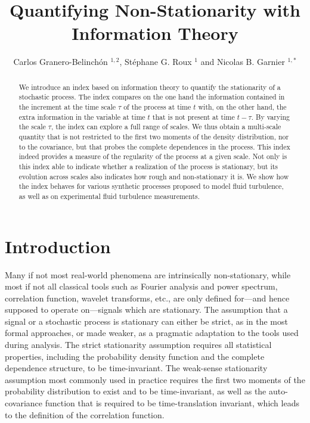 \documentclass[aps,pra,groupedaddress,notitlepage]{revtex4-1}
\begin{document}
\title{Quantifying Non-Stationarity with Information Theory}
\author{Carlos Granero-Belinch\'on $^{1,2}$, St\'ephane G. Roux $^1$  and  Nicolas B. Garnier $^{1,*}$}
\address{%
$^{1}$ Univ Lyon, Ens de Lyon, Univ Claude Bernard, CNRS UMR 5672, Laboratoire de Physique, F-69342 Lyon, France; \\
$^{2}$ IMT Atlantique, Lab-STICC, UMR CNRS 6285, F-29238 Brest, France.}

\begin{abstract}
We introduce an index based on information theory to quantify the stationarity of a stochastic process.
The index compares on the one hand the information contained in the increment at the time scale $\tau$ of the process at time $t$ with, on the other hand, the extra information in the variable at time $t$ that is not present at time $t-\tau$. By varying the scale $\tau$, the index can explore a full range of scales. We thus obtain a multi-scale quantity that is not restricted to the first two moments of the density distribution, nor to the covariance, but that probes the complete dependences in the process. 
This index indeed provides a measure of the regularity of the process at a given scale.
Not only is this index  able to indicate whether a realization of the process is stationary, but its evolution across scales also indicates how rough and non-stationary it is.
%
We show how the index behaves for various synthetic processes proposed to model fluid turbulence, as well as on experimental fluid turbulence measurements.
\end{abstract}

\maketitle 

\section{Introduction}

Many if not most real-world phenomena are intrinsically non-stationary, while most if not all classical tools such as Fourier analysis and power spectrum, correlation function, wavelet transforms, etc., are only defined for---and hence supposed to operate on---signals which are stationary. 
The assumption that a signal or a stochastic process is stationary can either be strict, as in the most formal approaches, or made weaker, as a pragmatic adaptation to the tools used during analysis. The strict stationarity assumption requires all statistical properties, including the probability density function and the complete dependence structure, to be time-invariant. The weak-sense stationarity assumption most commonly used in practice requires the first two moments of the probability distribution to exist and to be time-invariant, as well as the auto-covariance function that is required to be time-translation invariant, which leads to the definition of the correlation function. 
\end{document}
